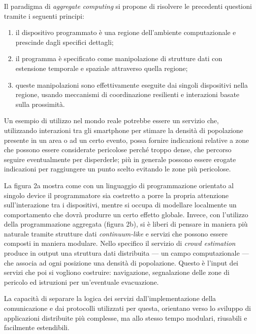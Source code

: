 Il paradigma di \textit{aggregate computing} si propone di risolvere le
precedenti questioni tramite i seguenti principi:
\begin{enumerate}
\item il dispositivo programmato è una regione dell'ambiente computazionale e
  prescinde dagli specifici dettagli;
\item il programma è specificato come manipolazione di strutture dati con
  estensione temporale e spaziale attraverso quella regione;
\item queste manipolazioni sono effettivamente eseguite dai singoli dispositivi
  nella regione, usando meccanismi di coordinazione resilienti e interazioni
  basate sulla prossimità. \cite{DBLP:journals/computer/BealPV15}
\end{enumerate}

Un esempio di utilizzo nel mondo reale potrebbe essere un servizio che,
utilizzando interazioni tra gli smartphone per stimare la densità di popolazione
presente in un area o ad un certo evento, possa fornire indicazioni relative a
zone che possono essere considerate pericolose perché troppo dense, che percorso
seguire eventualmente per disperderle; più in generale possono essere erogate
indicazioni per raggiungere un punto scelto evitando le zone più pericolose.

La figura 2a mostra come con un linguaggio di programmazione orientato al
singolo device il programmatore sia costretto a porre la propria attenzione
sull'interazione tra i dispositivi, mentre si occupa di modellare localmente un
comportamento che dovrà produrre un certo effetto globale.
Invece, con l'utilizzo della programmazione aggregata (figura 2b), si è liberi
di pensare in maniera più naturale tramite strutture dati
\textit{continuum-like} e servizi che possono essere composti in maniera modulare.
Nello specifico il servizio di \textit{crowd estimation} produce in output una
struttura dati distribuita --- un campo computazionale --- che associa ad ogni
posizione una densità di popolazione. Questo è l'input dei servizi che poi si
vogliono costruire: navigazione, segnalazione delle zone di pericolo ed
istruzioni per un'eventuale evacuazione.

La capacità di separare la logica dei servizi dall'implementazione della
comunicazione e dai protocolli utilizzati per questa, orientano verso lo
sviluppo di applicazioni distribuite più complesse, ma allo stesso tempo
modulari, riusabili e facilmente estendibili.

